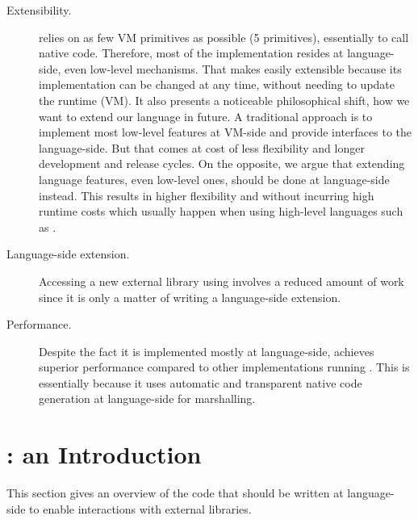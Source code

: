\begin{description}
	\item[Extensibility.] \NBFFI relies on as few VM primitives as possible (5 primitives), essentially to call native code. 
	Therefore, most of the implementation resides at language-side, even low-level mechanisms.
	That makes \NBFFI easily extensible because its implementation can be changed at any time, without needing to update the runtime (VM).
	It also presents a noticeable philosophical shift, how we want to extend our language in future.
	A traditional approach is to implement most low-level features at VM-side and provide interfaces to the language-side.
	But that comes at cost of less flexibility and longer development and release cycles.
	On the opposite, we argue that extending language features, even low-level ones, should be done at language-side instead.
	This results in higher flexibility and without incurring high runtime costs which usually happen when using high-level languages such as \ST.
	\item[Language-side extension.] Accessing a new external library using \NBFFI involves a reduced amount of work since it is only a matter of writing a language-side extension.
	\item[Performance.] Despite the fact it is implemented mostly at language-side, \NBFFI achieves superior performance compared to other \FFI implementations running \PH.
    This is essentially because it uses automatic and transparent native code generation at language-side for marshalling.
\end{description}



\section{\NBFFI: an Introduction}

This section gives an overview of the code that should be written at language-side
to enable interactions with external libraries.

